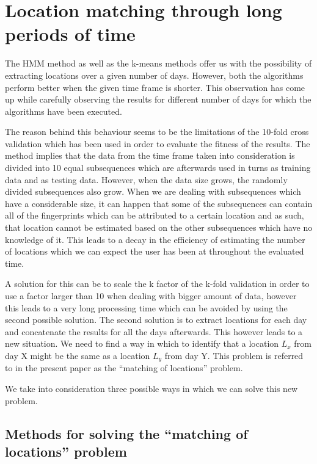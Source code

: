 \chapter{Location matching through long periods of time}

The HMM method as well as the k-means methods offer us with the possibility of
extracting locations over a given number of days. However, both the algorithms
perform better when the given time frame is shorter. This observation has come
up while carefully observing the results for different number of days for which
the algorithms have been executed. 

The reason behind this behaviour seems to be the limitations of the 10-fold
cross validation which has been used in order to evaluate the fitness of the
results. The method implies that the data from the time frame taken into
consideration is divided into 10 equal subsequences which are afterwards used in
turns as training data and as testing data. However, when the data size grows,
the randomly divided subsequences also grow. When we are dealing with
subsequences which have a considerable size, it can happen that some of the
subsequences can contain all of the fingerprints which can be attributed to a
certain location and as such, that location cannot be estimated based on the
other subsequences which have no knowledge of it. This leads to a decay in the
efficiency of estimating the number of locations which we can expect the user
has been at throughout the evaluated time.

A solution for this can be to scale the k factor of the k-fold validation in
order to use a factor larger than 10 when dealing with bigger amount of data,
however this leads to a very long processing time which can be avoided by using
the second possible solution. The second solution is to extract locations for
each day and concatenate the results for all the days afterwards. This however
leads to a new situation. We need to find a way in which to identify that a
location $L_{x}$ from day X might be the same as a location $L_{y}$ from day Y.
This problem is referred to in the present paper as the ``matching of
locations'' problem.

We take into consideration three possible ways in which we can solve this new
problem.

\section{Methods for solving the ``matching of locations'' problem}


